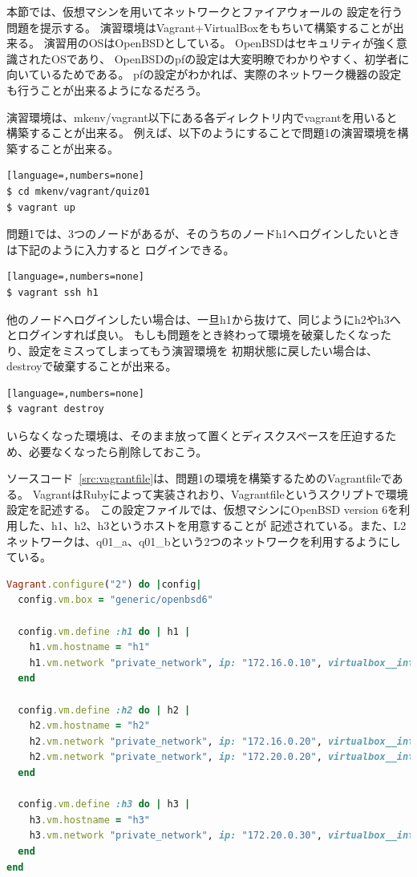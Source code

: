 
本節では、仮想マシンを用いてネットワークとファイアウォールの
設定を行う問題を提示する。
演習環境はVagrant+VirtualBoxをもちいて構築することが出来る。
演習用のOSはOpenBSDとしている。
OpenBSDはセキュリティが強く意識されたOSであり、
OpenBSDのpfの設定は大変明瞭でわかりやすく、初学者に向いているためである。
pfの設定がわかれば、実際のネットワーク機器の設定も行うことが出来るようになるだろう。

演習環境は、mkenv/vagrant以下にある各ディレクトリ内でvagrantを用いると
構築することが出来る。
例えば、以下のようにすることで問題1の演習環境を構築することが出来る。
\begin{lstlisting}[language=,numbers=none]
$ cd mkenv/vagrant/quiz01
$ vagrant up
\end{lstlisting}
問題1では、3つのノードがあるが、そのうちのノードh1へログインしたいときは下記のように入力すると
ログインできる。
\begin{lstlisting}[language=,numbers=none]
$ vagrant ssh h1
\end{lstlisting}
他のノードへログインしたい場合は、一旦h1から抜けて、同じようにh2やh3へとログインすれば良い。
もしも問題をとき終わって環境を破棄したくなったり、設定をミスってしまってもう演習環境を
初期状態に戻したい場合は、destroyで破棄することが出来る。
\begin{lstlisting}[language=,numbers=none]
$ vagrant destroy
\end{lstlisting}
いらなくなった環境は、そのまま放って置くとディスクスペースを圧迫するため、必要なくなったら削除しておこう。

ソースコード~\ref{src:vagrantfile}は、問題1の環境を構築するためのVagrantfileである。
VagrantはRubyによって実装されおり、Vagrantfileというスクリプトで環境設定を記述する。
この設定ファイルでは、仮想マシンにOpenBSD version 6を利用した、h1、h2、h3というホストを用意することが
記述されている。また、L2ネットワークは、q01\_a、q01\_bという2つのネットワークを利用するようにしている。
\begin{lstlisting}[language=Ruby,caption=演習問題1のVagrantfile,label=src:vagrantfile]
Vagrant.configure("2") do |config|
  config.vm.box = "generic/openbsd6"

  config.vm.define :h1 do | h1 |
    h1.vm.hostname = "h1"
    h1.vm.network "private_network", ip: "172.16.0.10", virtualbox__intnet: "q01_a"
  end

  config.vm.define :h2 do | h2 |
    h2.vm.hostname = "h2"
    h2.vm.network "private_network", ip: "172.16.0.20", virtualbox__intnet: "q01_a"
    h2.vm.network "private_network", ip: "172.20.0.20", virtualbox__intnet: "q01_b"
  end

  config.vm.define :h3 do | h3 |
    h3.vm.hostname = "h3"
    h3.vm.network "private_network", ip: "172.20.0.30", virtualbox__intnet: "q01_b"
  end
end
\end{lstlisting}


